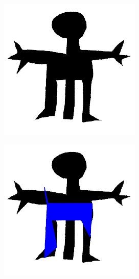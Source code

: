 \documentclass[twocolumn]{article}
\begin{document}
\begin{figure}
    \begin{subfigure}{0.23\textwidth}
        \includegraphics[width=0.92\linewidth]{img/tripod/target.png}
    \end{subfigure}
    \begin{subfigure}{0.23\textwidth}
        \includegraphics[width=0.92\linewidth]{img/tripod/iter_99.png}
    \end{subfigure}


\end{figure}
\end{document}
